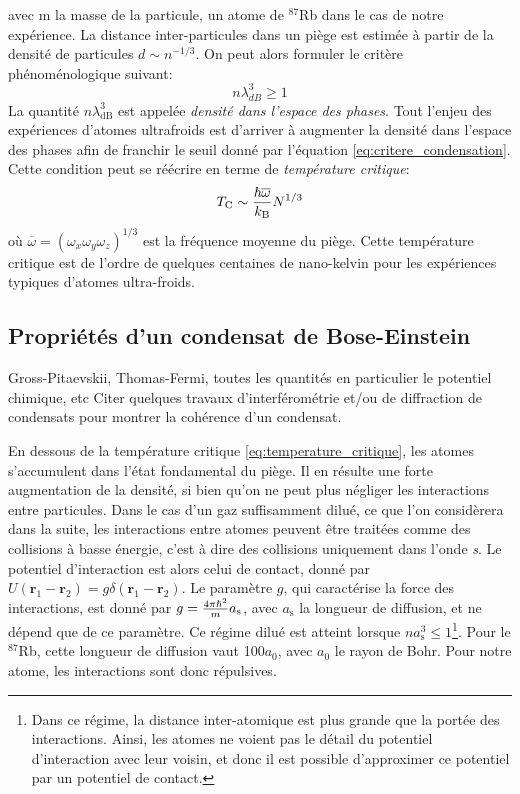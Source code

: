 avec m la masse de la particule, un atome de ${}^{87}$Rb dans le cas de notre expérience. La distance inter-particules dans un piège est estimée à partir de la densité de particules $d \sim n^{-1/3}$. On peut alors formuler le critère phénoménologique suivant:
\begin{equation}
n \lambda_{dB}^3 \geqslant 1
\label{eq:critere_condensation}
\end{equation}
La quantité $n \lambda_{\mathrm{dB}}^3$ est appelée \emph{densité dans l'espace des phases}. Tout l'enjeu des expériences d'atomes ultrafroids est d'arriver à augmenter la densité dans l'espace des phases afin de franchir le seuil donné par l'équation \ref{eq:critere_condensation}. Cette condition peut se réécrire en terme de \emph{température critique}:
\begin{equation}
T_{\mathrm{C}}\sim \frac{\hslash \overline{\omega}}{k_{\mathrm{B}}}N^{1/3}
\label{eq:temperature_critique}
\end{equation}
où $\overline{\omega}=(\omega_x \omega_y \omega_z)^{1/3}$ est la fréquence moyenne du piège. Cette température critique est de l'ordre de quelques centaines de nano-kelvin pour les expériences typiques d'atomes ultra-froids.


\subsection{Propriétés d'un condensat de Bose-Einstein}
Gross-Pitaevskii, Thomas-Fermi, toutes les quantités en particulier le potentiel chimique, etc
Citer quelques travaux d'interférométrie et/ou de diffraction de condensats pour montrer la cohérence d'un condensat.

En dessous de la température critique \ref{eq:temperature_critique}, les atomes s'accumulent dans l'état fondamental du piège. Il en résulte une forte augmentation de la densité, si bien qu'on ne peut plus négliger les interactions entre particules. Dans le cas d'un gaz suffisamment dilué, ce que l'on considèrera dans la suite, les interactions entre atomes peuvent être traitées comme des collisions à basse énergie, c'est à dire des collisions uniquement dans l'onde \emph{s}. Le potentiel d'interaction est alors celui de contact, donné par $U(\mathbf{r}_1-\mathbf{r}_2)=g\delta(\mathbf{r}_1-\mathbf{r}_2)$. Le paramètre $g$, qui caractérise la force des interactions, est donné par $g=\frac{4 \pi \hslash^2}{m}a_{\mathrm{s}}$, avec $a_{\mathrm{s}}$ la longueur de diffusion, et ne dépend que de ce paramètre. Ce régime dilué est atteint lorsque $na_{\mathrm{s}}^3\leqslant 1$\footnote{Dans ce régime, la distance inter-atomique est plus grande que la portée des interactions. Ainsi, les atomes ne voient pas le détail du potentiel d'interaction avec leur voisin, et donc il est possible d'approximer ce potentiel par un potentiel de contact.}. Pour le ${}^{87}$Rb, cette longueur de diffusion vaut 100$a_{\mathrm{0}}$, avec $a_{\mathrm{0}}$ le rayon de Bohr. Pour notre atome, les interactions sont donc répulsives.

